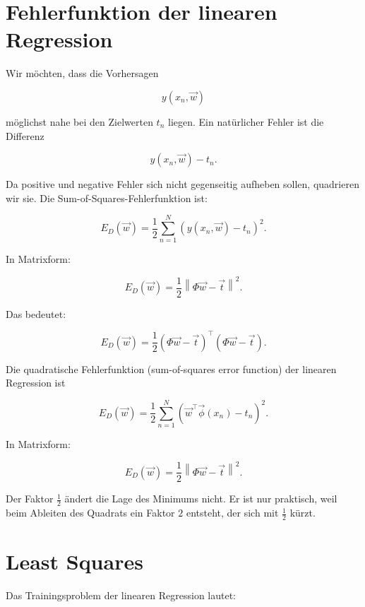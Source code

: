 \section{Fehlerfunktion der linearen Regression}

Wir möchten, dass die Vorhersagen

\[
    y(x_n,\vec{w})
\]

möglichst nahe bei den Zielwerten \(t_n\) liegen.
Ein natürlicher Fehler ist die Differenz

\[
    y(x_n,\vec{w}) - t_n.
\]

Da positive und negative Fehler sich nicht gegenseitig aufheben sollen, quadrieren wir sie.
Die Sum-of-Squares-Fehlerfunktion ist:

\[
    E_D(\vec{w})
    =
    \frac{1}{2}
    \sum_{n=1}^{N}
    \left(
        y(x_n,\vec{w}) - t_n
    \right)^2.
\]

In Matrixform:

\[
    E_D(\vec{w})
    =
    \frac{1}{2}
    \left\|
        \Phi\vec{w}-\vec{t}
    \right\|^2.
\]

Das bedeutet:

\[
    E_D(\vec{w})
    =
    \frac{1}{2}
    (\Phi\vec{w}-\vec{t})^{\top}
    (\Phi\vec{w}-\vec{t}).
\]

\begin{definitionbox}
Die quadratische Fehlerfunktion (sum-of-squares error function) der linearen Regression ist

\[
    E_D(\vec{w})
    =
    \frac{1}{2}
    \sum_{n=1}^{N}
    \left(
        \vec{w}^{\top}\vec{\phi}(x_n)-t_n
    \right)^2.
\]

In Matrixform:

\[
    E_D(\vec{w})
    =
    \frac{1}{2}
    \left\|
        \Phi\vec{w}-\vec{t}
    \right\|^2.
\]
\end{definitionbox}

\begin{notebox}
Der Faktor \(\frac{1}{2}\) ändert die Lage des Minimums nicht.
Er ist nur praktisch, weil beim Ableiten des Quadrats ein Faktor \(2\) entsteht, der sich mit \(\frac{1}{2}\) kürzt.
\end{notebox}

\section{Least Squares}

Das Trainingsproblem der linearen Regression lautet:

